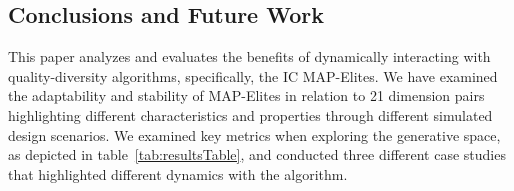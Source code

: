 \subsection{Conclusions and Future Work}


This paper analyzes and evaluates the benefits of dynamically interacting with quality-diversity algorithms, specifically, the IC MAP-Elites. We have examined the adaptability and stability of MAP-Elites in relation to 21 dimension pairs highlighting different characteristics and properties through different simulated design scenarios. We examined key metrics when exploring the generative space, as depicted in table~\ref{tab:resultsTable}, and conducted three different case studies that highlighted different dynamics with the algorithm.

 

